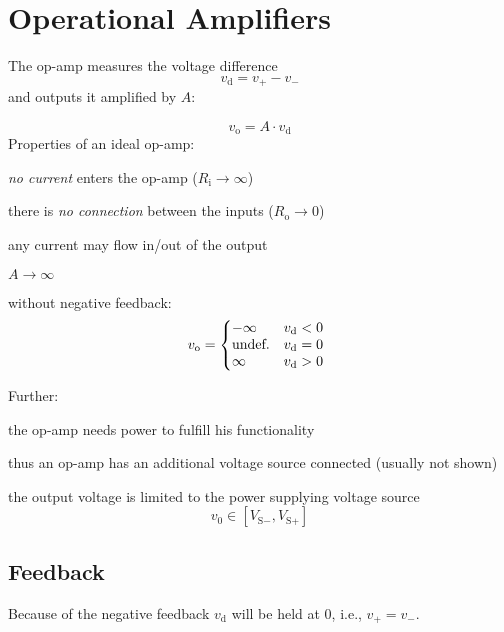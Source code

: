 
\section{Operational Amplifiers} %
	
	The op-amp measures the voltage difference \[
		v_{\text{d}} = v_+ - v_-
	\] and outputs it amplified by $A$:
	
	\vspace{-1.5cm}
	\hspace{.6\columnwidth}
	\vspace{-2.25cm}
	
	\[
		v_{\text{o}} = A \cdot v_{\text{d}}
	\]
	Properties of an ideal op-amp:
	\begin{tightitemize}
		\item \emph{no current} enters the op-amp ($R_{\text{i}} \to \infty$)
		\item there is \emph{no connection} between the inputs ($R_{\text{o}} \to 0$)
		\item any current may flow in/out of the output
		\item $A \to \infty$
		\item without negative feedback: \[
			v_{\text{o}} = \left\{
				\begin{array}{@{}l@{\quad}l}
					-\infty & v_{\text{d}} < 0 \\
					\text{undef.} & v_{\text{d}} = 0 \\
					\infty & v_{\text{d}} > 0
				\end{array}
			\right.
		\]
	\end{tightitemize}
	
	Further:
	\begin{tightitemize}
		\item the op-amp needs power to fulfill his functionality
		\item thus an op-amp has an additional voltage source connected (usually not shown)
		\item the output voltage is limited to the power supplying voltage source \[
			v_0 \in [V_{\text{S}-}, V_{\text{S}+}]
		\]
	\end{tightitemize}
	
	\subsection{Feedback} %
		Because of the negative feedback $v_{\text{d}}$ will be held at $0$, i.e., $v_+ = v_-$.
		
